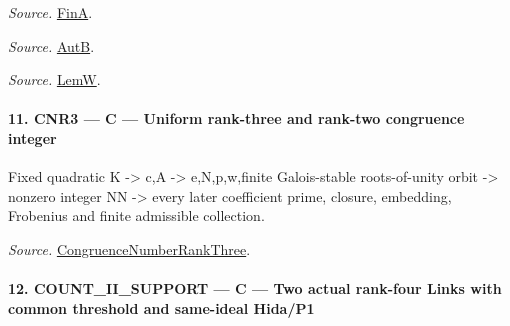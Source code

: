 \emph{Source.} \href{https://github.com/CocoSgt/riemann-hypothesis-lean/blob/7cbf7a0c32fca1badf05931879a37c3f8a2b03b4/src/Development/AutomorphicArithmetic/AutomorphicVarieties/AutomorphicCases/AutomorphyUnramifiedCoefficients.lean#L12-L13}{FinA}.

\emph{Source.} \href{https://github.com/CocoSgt/riemann-hypothesis-lean/blob/7cbf7a0c32fca1badf05931879a37c3f8a2b03b4/src/Development/AutomorphicArithmetic/AutomorphicVarieties/AutomorphicCases/AutomorphyUnramifiedCoefficients.lean#L15-L17}{AutB}.

\emph{Source.} \href{https://github.com/CocoSgt/riemann-hypothesis-lean/blob/7cbf7a0c32fca1badf05931879a37c3f8a2b03b4/src/Development/AutomorphicArithmetic/AutomorphicVarieties/AutomorphicCases/AutomorphyUnramifiedCoefficients.lean#L19-L22}{LemW}.



\paragraph{11. CNR3 — C — Uniform rank-three and rank-two congruence integer}

Fixed quadratic K -> c,A -> e,N,p,w,finite Galois-stable roots-of-unity orbit -> nonzero integer NN -> every later coefficient prime, closure, embedding, Frobenius and finite admissible collection.

\emph{Source.} \href{https://github.com/CocoSgt/riemann-hypothesis-lean/blob/7cbf7a0c32fca1badf05931879a37c3f8a2b03b4/src/Development/AutomorphicArithmetic/AutomorphicVarieties/AutomorphicForms/CongruenceNumberRankThree.lean#L125-L140}{CongruenceNumberRankThree}.



\paragraph{12. COUNT\_\allowbreak II\_\allowbreak SUPPORT — C — Two actual rank-four Links with common threshold and same-ideal Hida/P1}

